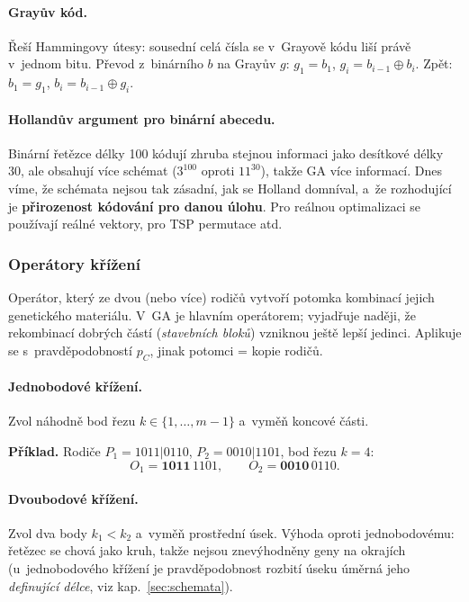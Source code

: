 \documentclass[11pt,a4paper]{article}
\theoremstyle{definition}
\begin{document}
\paragraph{Grayův kód.} Řeší Hammingovy útesy: sousední celá čísla se
v~Grayově kódu liší právě v~jednom bitu. Převod z~binárního $b$ na Grayův $g$:
$g_1 = b_1$, $g_i = b_{i-1} \oplus b_i$. Zpět: $b_1 = g_1$,
$b_i = b_{i-1} \oplus g_i$.

\paragraph{Hollandův argument pro binární abecedu.} Binární řetězce délky 100
kódují zhruba stejnou informaci jako desítkové délky 30, ale obsahují více
schémat ($3^{100}$ oproti $11^{30}$), takže GA  více informací.
Dnes víme, že schémata nejsou tak zásadní, jak se Holland domníval, a~že
rozhodující je \textbf{přirozenost kódování pro danou úlohu}. Pro reálnou
optimalizaci se používají reálné vektory, pro TSP permutace atd.

\subsubsection{Operátory křížení}

\begin{defbox}
Operátor, který ze dvou (nebo více) rodičů vytvoří potomka kombinací jejich
genetického materiálu. V~GA je hlavním operátorem; vyjadřuje naději, že
rekombinací dobrých částí (\emph{stavebních bloků}) vzniknou ještě lepší
jedinci. Aplikuje se s~pravděpodobností $p_C$, jinak potomci = kopie rodičů.
\end{defbox}

\paragraph{Jednobodové křížení.} Zvol náhodně bod řezu $k \in \{1,\dots,m-1\}$
a~vyměň koncové části.

\textbf{Příklad.} Rodiče $P_1 = 1011|0110$, $P_2 = 0010|1101$, bod řezu $k=4$:
\[
O_1 = \mathbf{1011}\,1101, \qquad O_2 = \mathbf{0010}\,0110.
\]

\paragraph{Dvoubodové křížení.} Zvol dva body $k_1 < k_2$ a~vyměň prostřední
úsek. Výhoda oproti jednobodovému: řetězec se chová jako kruh, takže nejsou
znevýhodněny geny na okrajích (u~jednobodového křížení je pravděpodobnost
rozbití úseku úměrná jeho \emph{definující délce}, viz kap.~\ref{sec:schemata}).
\end{document}
